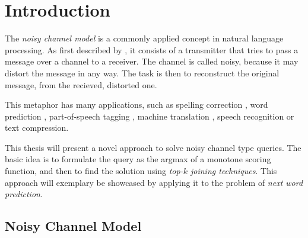 \chapter{Introduction}
\label{ch:introduction}

The \emph{noisy channel model} is a commonly applied concept in natural language
processing.
As first described by \textcite{Shannon1948}, it consists of a transmitter that
tries to pass a message over a channel to a receiver.
The channel is called noisy, because it may distort the message in any way.
The task is then to reconstruct the original message, from the recieved,
distorted one.

This metaphor has many applications, such as spelling correction
\parencite{JurafskyMartin2009,Manning2008,Kernighan1990,Mays1991},
word prediction \parencite{Bickel2005}, part-of-speech tagging
\parencite{Church1988}, machine translation \parencite{Brown1990}, speech
recognition or text compression.

This thesis will present a novel approach to solve noisy channel type queries.
The basic idea is to formulate the query as the argmax of a monotone scoring
function, and then to find the solution using \emph{top-$k$ joining techniques}.
This approach will exemplary be showcased by applying it to the problem of
\emph{next word prediction}.

\section{Noisy Channel Model}

